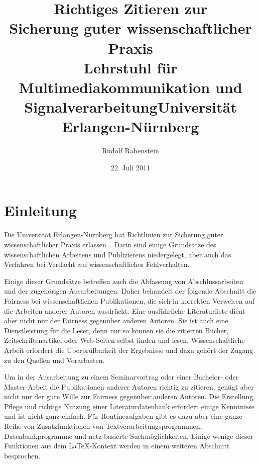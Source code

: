 \documentclass[a4paper, 10pt]{article}
\begin{document}
\date{22. Juli 2011}								
		

\title{
\textbf{Richtiges Zitieren zur\\ Sicherung guter wissenschaftlicher Praxis
\\[2ex]
{\small 
Lehrstuhl f\"ur Multimediakommunikation und
Signalverarbeitung\linebreak Universit\"at Erlangen-N\"urnberg\\
}}
}

\author{Rudolf Rabenstein}

\maketitle
\thispagestyle{empty} 			

\section{Einleitung}
\label{sec:intro} 

Die Universit\"at Erlangen-N\"urnberg hat Richtlinien zur Sicherung guter
wissenschaftlicher Praxis erlassen~\cite{FAU:wiss-Prax:2002}. Darin sind einige
Grunds\"atze des wissenschaftlichen Arbeitens und Publizierens niedergelegt,
aber auch das Verfahren bei Verdacht auf wissenschaftliches Fehlverhalten.

Einige dieser Grunds\"atze betreffen auch die Abfassung von Abschlussarbeiten
und der zugeh\"origen Ausarbeitungen. Daher behandelt der folgende Abschnitt
die Fairness bei wissenschaftlichen Publikationen, die sich in
korrekten Verweisen auf die Arbeiten anderer Autoren ausdr\"uckt. Eine
ausf\"uhrliche Literaturliste dient aber nicht nur der Fairness gegen\"uber
anderen Autoren.  Sie ist auch eine Dienstleistung f\"ur die Leser, denn nur so
k\"onnen sie die zitierten B\"ucher, Zeitschriftenartikel oder Web-Seiten 
selbst finden und lesen. Wissenschaftliche Arbeit erfordert die
\"Uberpr\"ufbarkeit der Ergebnisse und dazu geh\"ort der Zugang zu den Quellen
und
Vorarbeiten.

Um in der Ausarbeitung zu einem Seminarvortrag oder einer Bachelor- oder
Master-Arbeit die Publikationen anderer Autoren richtig zu zitieren, gen\"ugt
aber nicht nur der gute Wille zur Fairness gegen\"uber anderen Autoren. 
Die Erstellung, Pflege und richtige Nutzung einer
Literaturdatenbank erfordert einige Kenntnisse und ist nicht ganz einfach.
F\"ur Routineaufgaben gibt es dazu aber eine ganze Reihe von
Zusatzfunktionen von Textverarbeitungsprogrammen, Datenbankprogramme und
netz-basierte Suchm\"oglichkeiten. Einige wenige dieser Funktionen aus dem
\LaTeX-Kontext werden in einem weiteren Abschnitt besprochen. 
\end{document}
